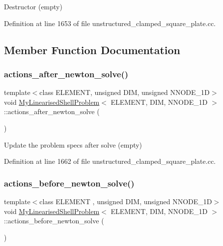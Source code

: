 Destructor (empty) 



Definition at line 1653 of file unstructured\+\_\+clamped\+\_\+square\+\_\+plate.\+cc.



\subsection{Member Function Documentation}
\mbox{\label{classMyLinearisedShellProblem_a8ad6606f22859a5bd32d238bcc10efd1}} 
\subsubsection{\texorpdfstring{actions\+\_\+after\+\_\+newton\+\_\+solve()}{actions\_after\_newton\_solve()}}
{\footnotesize\ttfamily template$<$class E\+L\+E\+M\+E\+NT, unsigned D\+IM, unsigned N\+N\+O\+D\+E\+\_\+1D$>$ \\
void \hyperlink{classMyLinearisedShellProblem}{My\+Linearised\+Shell\+Problem}$<$ E\+L\+E\+M\+E\+NT, D\+IM, N\+N\+O\+D\+E\+\_\+1D $>$\+::actions\+\_\+after\+\_\+newton\+\_\+solve (\begin{DoxyParamCaption}{ }\end{DoxyParamCaption})\hspace{0.3cm}{\ttfamily [inline]}}



Update the problem specs after solve (empty) 



Definition at line 1662 of file unstructured\+\_\+clamped\+\_\+square\+\_\+plate.\+cc.

\mbox{\label{classMyLinearisedShellProblem_a81d050ee6958694b7645ea73cc8e4e9f}} 
\subsubsection{\texorpdfstring{actions\+\_\+before\+\_\+newton\+\_\+solve()}{actions\_before\_newton\_solve()}}
{\footnotesize\ttfamily template$<$class E\+L\+E\+M\+E\+NT , unsigned D\+IM, unsigned N\+N\+O\+D\+E\+\_\+1D$>$ \\
void \hyperlink{classMyLinearisedShellProblem}{My\+Linearised\+Shell\+Problem}$<$ E\+L\+E\+M\+E\+NT, D\+IM, N\+N\+O\+D\+E\+\_\+1D $>$\+::actions\+\_\+before\+\_\+newton\+\_\+solve (\begin{DoxyParamCaption}{ }\end{DoxyParamCaption})}



